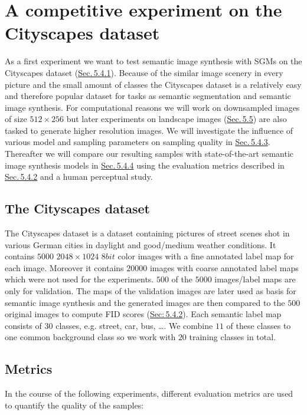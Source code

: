 
\section[A competitive experiment on the Cityscapes dataset]{A competitive experiment on the Cityscapes dataset%
    } \label{sec:5.4}
%
As a first experiment we want to test semantic image synthesis with SGMs on the Cityscapes dataset \cite{cityscapes} (\hyperref[sec:5.4.1]{Sec.\,5.4.1}). Because of the similar image scenery in every picture and the small amount of classes the Cityscapes dataset is a relatively easy and therefore popular dataset for tasks as semantic segmentation and semantic image synthesis. For computational reasons we will work on downsampled images of size $512\times256$ but later experiments on landscape images (\hyperref[sec:5.5]{Sec.\,5.5}) are also tasked to generate higher resolution images. We will investigate the influence of various model and sampling parameters on sampling quality in \hyperref[sec:5.4.3]{Sec.\,5.4.3}. Thereafter we will compare our resulting samples with state-of-the-art semantic image synthesis models in \hyperref[sec:5.4.4]{Sec.\,5.4.4} using the evaluation metrics described in \hyperref[sec:5.4.2]{Sec.\,5.4.2} and a human perceptual study.

\subsection{The Cityscapes dataset}
The Cityscapes dataset \cite{cityscapes} is a dataset containing pictures of street scenes shot in various German cities in daylight and good/medium weather conditions. It contains $5000$ $2048\times1024$ $8bit$ color images with a fine annotated label map for each image. Moreover it contains $20000$ images with coarse annotated label maps which were not used for the experiments. $500$ of the $5000$ images/label maps are only for validation. The maps of the validation images are later used as basis for semantic image synthesis and the generated images are then compared to the $500$ original images to compute FID scores (\hyperref[sec:fid]{Sec:\,5.4.2}). Each semantic label map consists of $30$ classes, e.g. street, car, bus, \dots. We combine $11$ of these classes to one common background class so we work with $20$ training classes in total.
%
\subsection{Metrics} \label{sec:5.4.2}
In the course of the following experiments, different evaluation metrics are used to quantify the quality of the samples:
%

